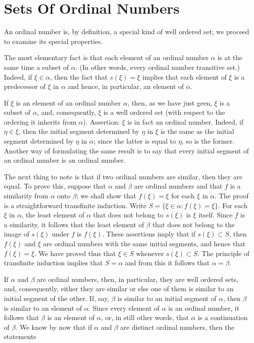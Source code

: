 
\chapter{Sets Of Ordinal Numbers} 

An ordinal number is, by definition, a special kind of well ordered set; we proceed to examine its special properties. 

The most elementary fact is that each element of an ordinal number $\alpha$ is at the same time a subset of $\alpha$. (In other words, every ordinal number transitive set.) Indeed, if $\xi \in \alpha$, then the fact that $s( \xi ) = \xi$ implies that each element of $\xi$ is a predecessor of $\xi$ in $\alpha$ and hence, in particular, an element of $\alpha$. 

If $\xi$ is an element of an ordinal number $\alpha$, then, as we have just geen, $\xi$ is a subset of $\alpha$, and, consequently, $\xi$ is a well ordered set (with respect to the ordering it inherits from $\alpha$). Assertion: $\xi$ is in fact an ordinal number. Indeed, if $\eta \in \xi$, then the initial segment determined by $\eta$ in $\xi$ is the same as the initial segment determined by $\eta$ in $\alpha$; since the latter is equal to $\eta$, so is the former. Another way of formulating the same result is to say that every initial segment of an ordinal number is an ordinal number. 

The next thing to note is that if two ordinal numbers are similar, then they are equal. To prove this, suppose that $\alpha$ and $\beta$ are ordinal numbers and that $f$ is a similarity from $\alpha$ onto $\beta$; we shall show that $f( \xi ) = \xi$ for each $\xi$ in $\alpha$. The proof is a straightforward transfinite induction. Write $S = \{ \xi \in \alpha : f( \xi ) = \xi \}$. For each $\xi$ in $\alpha$, the least element of $\alpha$ that does not belong to $s( \xi )$ is $\xi$ itself. Since $f$ is a similarity, it follows that the least element of $\beta$ that does not belong to the image of $s( \xi )$ under $f$ is $f( \xi )$. These assertions imply that if $s( \xi ) \subset S$, then $f(\xi )$ and $\xi$ are ordinal numbers with the same initial segments, and hence that $f(\xi ) = \xi$. We have proved thus that $\xi \in S$ whenever  $s( \xi ) \subset S$. The principle of transfinite induction implies that $S = \alpha$ and from this it follows that $\alpha = \beta$.

If $\alpha$ and $\beta$ are ordinal numbers, then, in particular, they are well ordered sets, and, consequently, either they are similar or else one of them is similar to an initial segment of the other. If, say, $\beta$ is similar to an initial segment of $\alpha$, then $\beta$ is similar to an element of $\alpha$. Since every element of $\alpha$ is an ordinal number, it follows that $\beta$ is an element of $\alpha$, or, in still other words, that $\alpha$ is a continuation of $\beta$. We know by now that if $\alpha$ and $\beta$ are distinct ordinal numbers, then the statements 

